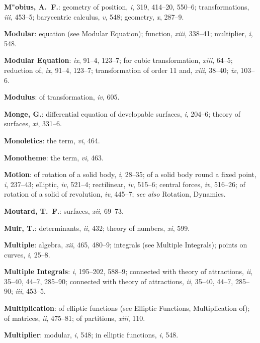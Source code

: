 \documentclass[11pt,a4paper]{article}
\newcommand{\IndexEntry}[1]{\textbf{#1}}
\newcommand{\V}[1]{\textit{#1}} %
\begin{document}
\IndexEntry{M"obius, A.\ F.}: geometry of position, \V{i}, 319, 414--20, 550--6; transformations, \V{iii}, 453--5; barycentric calculus, \V{v}, 548; geometry, \V{x}, 287--9.

\IndexEntry{Modular}: equation (see Modular Equation); function, \V{xiii}, 338--41; multiplier, \V{i}, 548.

\IndexEntry{Modular Equation}: \V{ix}, 91--4, 123--7; for cubic transformation, \V{xiii}, 64--5; reduction of, \V{ix}, 91--4, 123--7; transformation of order 11 and, \V{xiii}, 38--40; \V{ix}, 103--6.

\IndexEntry{Modulus}: of transformation, \V{iv}, 605.

\IndexEntry{Monge, G.}: differential equation of developable surfaces, \V{i}, 204--6; theory of surfaces, \V{xi}, 331--6.

\IndexEntry{Monoletics}: the term, \V{vi}, 464.

\IndexEntry{Monotheme}: the term, \V{vi}, 463.

\IndexEntry{Motion}: of rotation of a solid body, \V{i}, 28--35; of a solid body round a fixed point, \V{i}, 237--43; elliptic, \V{iv}, 521--4; rectilinear, \V{iv}, 515--6; central forces, \V{iv}, 516--26; of rotation of a solid of revolution, \V{iv}, 445--7; \textit{see also} Rotation, Dynamics.

\IndexEntry{Moutard, T.\ F.}: surfaces, \V{xii}, 69--73.

\IndexEntry{Muir, T.}: determinants, \V{ii}, 432; theory of numbers, \V{xi}, 599.

\IndexEntry{Multiple}: algebra, \V{xii}, 465, 480--9; integrals (see Multiple Integrals); points on curves, \V{i}, 25--8.

\IndexEntry{Multiple Integrals}: \V{i}, 195--202, 588--9; connected with theory of attractions, \V{ii}, 35--40, 44--7, 285--90; connected with theory of attractions, \V{ii}, 35--40, 44--7, 285--90; \V{iii}, 453--5.

\IndexEntry{Multiplication}: of elliptic functions (see Elliptic Functions, Multiplication of); of matrices, \V{ii}, 475--81; of partitions, \V{xiii}, 110.

\newpage

\setcounter{page}{113}

\IndexEntry{Multiplier}: modular, \V{i}, 548; in elliptic functions, \V{i}, 548.
\end{document}
